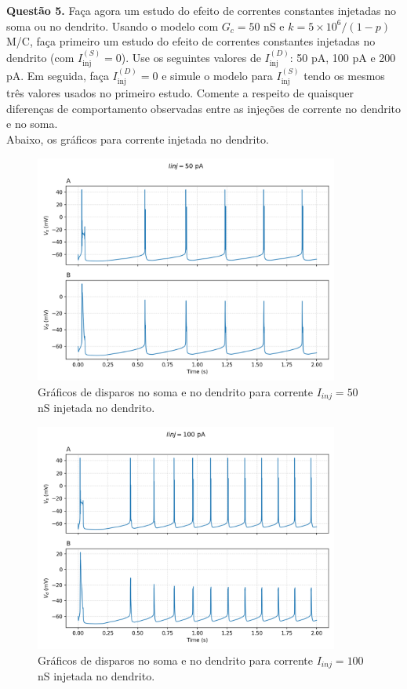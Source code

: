 \documentclass[english,11pt,a4paper]{article}
\begin{document}
	
	
	\noindent \textbf{Questão 5.} Faça agora um estudo do efeito de correntes constantes injetadas no soma ou no dendrito. Usando o modelo com \(G_c = 50\) nS e \(k = 5 \times 10^6 / (1 - p)\) M/C, faça primeiro um estudo do efeito de correntes constantes injetadas no dendrito (com \(I^{(S)}_{\text{inj}} = 0\)). Use os seguintes valores de \(I^{(D)}_{\text{inj}}\): 50 pA, 100 pA e 200 pA. Em seguida, faça \(I^{(D)}_{\text{inj}} = 0\) e simule o modelo para \(I^{(S)}_{\text{inj}}\) tendo os mesmos três valores usados no primeiro estudo. Comente a respeito de quaisquer diferenças de comportamento observadas entre as injeções de corrente no dendrito e no soma.\\
	
	Abaixo, os gráficos para corrente injetada no dendrito.
	
	\begin{figure}[H]
		\centering
		\includegraphics[width=10cm]{../figures/ex_5_I50_dend.png}
		\caption{Gráficos de disparos no soma e no dendrito para corrente $I_{inj} = 50$ nS injetada no dendrito.}
	\end{figure}
	
	\begin{figure}[H]
		\centering
		\includegraphics[width=10cm]{../figures/ex_5_I100_dend.png}
		\caption{Gráficos de disparos no soma e no dendrito para corrente $I_{inj} = 100$ nS injetada no dendrito.}
	\end{figure}
	
\end{document}

